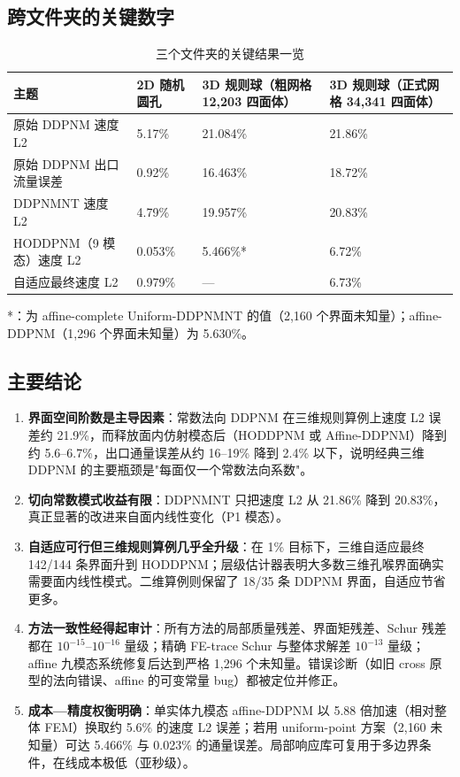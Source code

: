 \documentclass[11pt,a4paper]{ctexart}
\newcommand{\Dd}{DDPNM}
\begin{document}
\subsection{跨文件夹的关键数字}
\label{sec:synthesis-numbers}

\begin{table}[h]
\centering
\caption{三个文件夹的关键结果一览}
\begin{tabular}{llll}
\toprule
主题 & 2D 随机圆孔 & 3D 规则球（粗网格 12{,}203 四面体） & 3D 规则球（正式网格 34{,}341 四面体） \\
\midrule
原始 \Dd{} 速度 L2 & 5.17\%  & 21.084\% & 21.86\% \\
原始 \Dd{} 出口流量误差 & 0.92\% & 16.463\% & 18.72\% \\
\Dd{}NT 速度 L2 & 4.79\% & 19.957\% & 20.83\% \\
HODDPNM（9 模态）速度 L2 & 0.053\% & 5.466\%* & 6.72\% \\
自适应最终速度 L2 & 0.979\% & --- & 6.73\% \\
\bottomrule
\end{tabular}

\small
*：为 affine-complete Uniform-\Dd{}NT 的值（2{,}160 个界面未知量）；affine-\Dd{}（1{,}296 个界面未知量）为 5.630\%。
\end{table}

\subsection{主要结论}
\label{sec:synthesis-conclusions}

\begin{enumerate}[itemsep=3pt]
  \item \textbf{界面空间阶数是主导因素}：常数法向 \Dd{} 在三维规则算例上速度 L2 误差约 21.9\%，而释放面内仿射模态后（HODDPNM 或 Affine-\Dd{}）降到约 5.6--6.7\%，出口通量误差从约 16--19\% 降到 2.4\% 以下，说明经典三维 \Dd{} 的主要瓶颈是"每面仅一个常数法向系数"。
  \item \textbf{切向常数模式收益有限}：\Dd{}NT 只把速度 L2 从 21.86\% 降到 20.83\%，真正显著的改进来自面内线性变化（P1 模态）。
  \item \textbf{自适应可行但三维规则算例几乎全升级}：在 1\% 目标下，三维自适应最终 142/144 条界面升到 HODDPNM；层级估计器表明大多数三维孔喉界面确实需要面内线性模式。二维算例则保留了 18/35 条 \Dd{} 界面，自适应节省更多。
  \item \textbf{方法一致性经得起审计}：所有方法的局部质量残差、界面矩残差、Schur 残差都在 $10^{-15}$--$10^{-16}$ 量级；精确 FE-trace Schur 与整体求解差 $10^{-13}$ 量级；affine 九模态系统修复后达到严格 1{,}296 个未知量。错误诊断（如旧 cross 原型的法向错误、affine 的可变常量 bug）都被定位并修正。
  \item \textbf{成本—精度权衡明确}：单实体九模态 affine-\Dd{} 以 5.88 倍加速（相对整体 FEM）换取约 5.6\% 的速度 L2 误差；若用 uniform-point 方案（2{,}160 未知量）可达 5.466\% 与 0.023\% 的通量误差。局部响应库可复用于多边界条件，在线成本极低（亚秒级）。
\end{enumerate}
\end{document}
